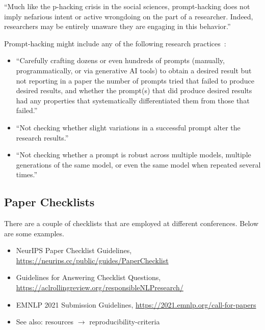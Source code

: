 \documentclass[manuscript, nonacm]{acmart}
\begin{document}
``Much like the p-hacking crisis in the social sciences, prompt-hacking does not imply nefarious intent or active wrongdoing on the part of a researcher. Indeed, researchers may be entirely unaware they are engaging in this behavior.''~\cite{DBLP:journals/cacm/PromptHacking}

Prompt-hacking might include any of the following research practices~\cite{DBLP:journals/cacm/PromptHacking}:

\begin{itemize}
\item ``Carefully crafting dozens or even hundreds of prompts (manually, programmatically, or via generative AI tools) to obtain a desired result but not reporting in a paper the number of prompts tried that failed to produce desired results, and whether the prompt(s) that did produce desired results had any properties that systematically differentiated them from those that failed.''

\item ``Not checking whether slight variations in a successful prompt alter the research results.''

\item ``Not checking whether a prompt is robust across multiple models, multiple generations of the same model, or even the same model when repeated several times.''
\end{itemize}


\subsection{Paper Checklists}

There are a couple of checklists that are employed at different conferences.
Below are some examples.

\begin{itemize}
\item NeurIPS Paper Checklist Guidelines, \url{https://neurips.cc/public/guides/PaperChecklist}

\item Guidelines for Answering Checklist Questions, \url{https://aclrollingreview.org/responsibleNLPresearch/}

\item EMNLP 2021 Submission Guidelines, \url{https://2021.emnlp.org/call-for-papers}

\item See also: resources $\rightarrow$ reproducibility-criteria

\end{itemize}
\end{document}
